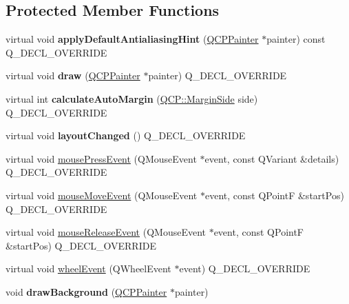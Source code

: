 \subsection*{Protected Member Functions}
\begin{DoxyCompactItemize}
\item 
virtual void {\bfseries apply\+Default\+Antialiasing\+Hint} (\hyperlink{classQCPPainter}{Q\+C\+P\+Painter} $\ast$painter) const Q\+\_\+\+D\+E\+C\+L\+\_\+\+O\+V\+E\+R\+R\+I\+DE\hypertarget{classQCPAxisRect_a4a318008e2b7f881a14c3d97186b31f9}{}\label{classQCPAxisRect_a4a318008e2b7f881a14c3d97186b31f9}

\item 
virtual void {\bfseries draw} (\hyperlink{classQCPPainter}{Q\+C\+P\+Painter} $\ast$painter) Q\+\_\+\+D\+E\+C\+L\+\_\+\+O\+V\+E\+R\+R\+I\+DE\hypertarget{classQCPAxisRect_af710c50530e370539a4439d6c4db9090}{}\label{classQCPAxisRect_af710c50530e370539a4439d6c4db9090}

\item 
virtual int {\bfseries calculate\+Auto\+Margin} (\hyperlink{namespaceQCP_a7e487e3e2ccb62ab7771065bab7cae54}{Q\+C\+P\+::\+Margin\+Side} side) Q\+\_\+\+D\+E\+C\+L\+\_\+\+O\+V\+E\+R\+R\+I\+DE\hypertarget{classQCPAxisRect_ac51055d83f5f414b6d013d3a24b0a941}{}\label{classQCPAxisRect_ac51055d83f5f414b6d013d3a24b0a941}

\item 
virtual void {\bfseries layout\+Changed} () Q\+\_\+\+D\+E\+C\+L\+\_\+\+O\+V\+E\+R\+R\+I\+DE\hypertarget{classQCPAxisRect_a575e38ac71a21906dc2d7b3364db2d62}{}\label{classQCPAxisRect_a575e38ac71a21906dc2d7b3364db2d62}

\item 
virtual void \hyperlink{classQCPAxisRect_aa9a7c807eaa4666870ac94aa6abc4dde}{mouse\+Press\+Event} (Q\+Mouse\+Event $\ast$event, const Q\+Variant \&details) Q\+\_\+\+D\+E\+C\+L\+\_\+\+O\+V\+E\+R\+R\+I\+DE
\item 
virtual void \hyperlink{classQCPAxisRect_a9cd27ad8c5cfb49aefd9dbb30def4beb}{mouse\+Move\+Event} (Q\+Mouse\+Event $\ast$event, const Q\+PointF \&start\+Pos) Q\+\_\+\+D\+E\+C\+L\+\_\+\+O\+V\+E\+R\+R\+I\+DE
\item 
virtual void \hyperlink{classQCPAxisRect_a6c89b988d3a0b93c0878f0ebdb5037f4}{mouse\+Release\+Event} (Q\+Mouse\+Event $\ast$event, const Q\+PointF \&start\+Pos) Q\+\_\+\+D\+E\+C\+L\+\_\+\+O\+V\+E\+R\+R\+I\+DE
\item 
virtual void \hyperlink{classQCPAxisRect_a93eeaa0c127d6d6fe8171b2455080262}{wheel\+Event} (Q\+Wheel\+Event $\ast$event) Q\+\_\+\+D\+E\+C\+L\+\_\+\+O\+V\+E\+R\+R\+I\+DE
\item 
void {\bfseries draw\+Background} (\hyperlink{classQCPPainter}{Q\+C\+P\+Painter} $\ast$painter)\hypertarget{classQCPAxisRect_ab49d338d1ce74b476fcead5b32cf06dc}{}\label{classQCPAxisRect_ab49d338d1ce74b476fcead5b32cf06dc}


\end{DoxyCompactItemize}

